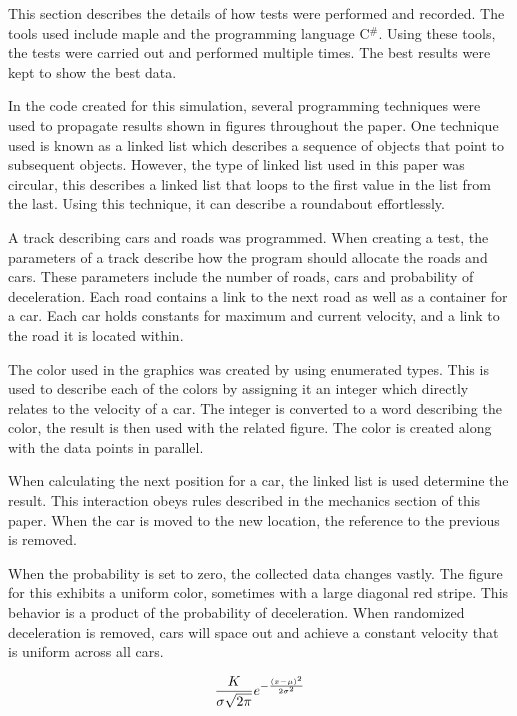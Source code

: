 \documentclass[12pt]{extarticle}
\begin{document}
This section describes the details of how tests were performed and recorded. The tools used include maple and the programming language C$^\#$. Using these tools, the tests were carried out and performed multiple times. The best results were kept to show the best data. 

In the code created for this simulation, several programming techniques were used to propagate results shown in figures throughout the paper. One technique used is known as a linked list which describes a sequence of objects that point to subsequent objects. However, the type of linked list used in this paper was circular, this describes a linked list that loops to the first value in the list from the last. Using this technique, it can describe a roundabout effortlessly. 

A track describing cars and roads was programmed. When creating a test, the parameters of a track describe how the program should allocate the roads and cars. These parameters include the number of roads, cars and probability of deceleration. Each road contains a link to the next road as well as a container for a car. Each car holds constants for maximum and current velocity, and a link to the road it is located within.

The color used in the graphics was created by using enumerated types. This is used to describe each of the colors by assigning it an integer which directly relates to the velocity of a car. The integer is converted to a word describing the color, the result is then used with the related figure. The color is created along with the data points in parallel.

When calculating the next position for a car, the linked list is used determine the result. This interaction obeys rules described in the mechanics section of this paper. When the car is moved to the new location, the reference to the previous is removed.

When the probability is set to zero, the collected data changes vastly. The figure for this exhibits a uniform color, sometimes with a large diagonal red stripe. This behavior is a product of the probability of deceleration. When randomized deceleration is removed, cars will space out and achieve a constant velocity that is uniform across all cars.



\begin{align}
\notag
\frac{K}{\sigma\sqrt{2\pi}}e^{-\frac{(x-\mu)^2}{2\sigma^2}}
\end{align}
\end{document}
